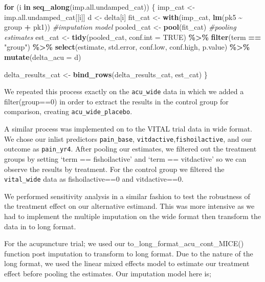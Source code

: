 \documentclass{article}
\newenvironment{Shaded}{\begin{snugshade}}{\end{snugshade}}
\newcommand{\AttributeTok}[1]{\textcolor[rgb]{0.13,0.29,0.53}{#1}}
\newcommand{\CommentTok}[1]{\textcolor[rgb]{0.56,0.35,0.01}{\textit{#1}}}
\newcommand{\ConstantTok}[1]{\textcolor[rgb]{0.56,0.35,0.01}{#1}}
\newcommand{\ControlFlowTok}[1]{\textcolor[rgb]{0.13,0.29,0.53}{\textbf{#1}}}
\newcommand{\FunctionTok}[1]{\textcolor[rgb]{0.13,0.29,0.53}{\textbf{#1}}}
\newcommand{\NormalTok}[1]{#1}
\newcommand{\OtherTok}[1]{\textcolor[rgb]{0.56,0.35,0.01}{#1}}
\newcommand{\SpecialCharTok}[1]{\textcolor[rgb]{0.81,0.36,0.00}{\textbf{#1}}}
\newcommand{\StringTok}[1]{\textcolor[rgb]{0.31,0.60,0.02}{#1}}
\begin{document}
\begin{Shaded}
\begin{Highlighting}[]
\ControlFlowTok{for}\NormalTok{ (i }\ControlFlowTok{in} \FunctionTok{seq\_along}\NormalTok{(imp.all.undamped\_cat)) \{}
\NormalTok{  imp\_cat }\OtherTok{\textless{}{-}}\NormalTok{ imp.all.undamped\_cat[[i]]}
\NormalTok{  d }\OtherTok{\textless{}{-}}\NormalTok{ delta[i]}
\NormalTok{  fit\_cat }\OtherTok{\textless{}{-}} \FunctionTok{with}\NormalTok{(imp\_cat, }\FunctionTok{lm}\NormalTok{(pk5 }\SpecialCharTok{\textasciitilde{}}\NormalTok{ group }\SpecialCharTok{+}\NormalTok{ pk1)) }\CommentTok{\#imputation model}
\NormalTok{  pooled\_cat }\OtherTok{\textless{}{-}} \FunctionTok{pool}\NormalTok{(fit\_cat) }\CommentTok{\#pooling estimates}
\NormalTok{  est\_cat }\OtherTok{\textless{}{-}} \FunctionTok{tidy}\NormalTok{(pooled\_cat, }\AttributeTok{conf.int =} \ConstantTok{TRUE}\NormalTok{) }\SpecialCharTok{\%\textgreater{}\%}
    \FunctionTok{filter}\NormalTok{(term }\SpecialCharTok{==} \StringTok{"group"}\NormalTok{) }\SpecialCharTok{\%\textgreater{}\%} 
    \FunctionTok{select}\NormalTok{(estimate, std.error, conf.low, conf.high, p.value) }\SpecialCharTok{\%\textgreater{}\%}
    \FunctionTok{mutate}\NormalTok{(}\AttributeTok{delta\_acu =}\NormalTok{ d)}
    
\NormalTok{  delta\_results\_cat }\OtherTok{\textless{}{-}} \FunctionTok{bind\_rows}\NormalTok{(delta\_results\_cat, est\_cat)}
\NormalTok{\}}
\end{Highlighting}
\end{Shaded}

We repeated this process exactly on the \texttt{acu\_wide} data in which
we added a filter(group==0) in order to extract the results in the
control group for comparison, creating \texttt{acu\_wide\_placebo}.

A similar process was implemented on to the VITAL trial data in wide
format. We chose our inlist predictors \texttt{pain\_base},
\texttt{vitdactive},\texttt{fishoilactive}, and our outcome as
\texttt{pain\_yr4}. After pooling our estimates, we filtered out the
treatment groups by setting `term == fishoilactive' and `term ==
vitdactive' so we can observe the results by treatment. For the control
group we filtered the \texttt{vital\_wide} data as fishoilactive==0 and
vitdactive==0.

We performed sensitivity analysis in a similar fashion to test the
robustness of the treatment effect on our alternative estimand. This was
more intensive as we had to implement the multiple imputation on the
wide format then transform the data in to long format.

For the acupuncture trial; we used our
to\_long\_format\_acu\_cont\_MICE() function post imputation to
transform to long format. Due to the nature of the long format, we used
the linear mixed effects model to estimate our treatment effect before
pooling the estimates. Our imputation model here is;
\end{document}
